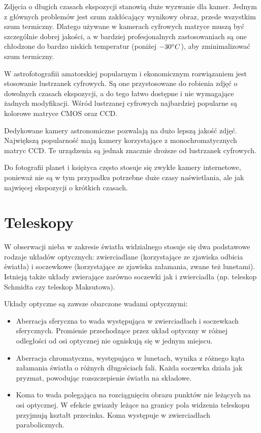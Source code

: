 Zdjęcia o długich czasach ekspozycji stanowią duże wyzwanie dla kamer. Jednym
z głównych problemów jest szum zakłócający wynikowy obraz, przede wszystkim szum
termiczny. Dlatego używane w kamerach cyfrowych matryce muszą być szczególnie
dobrej jakości, a w bardziej profesjonalnych zastosowaniach są one chłodzone do
bardzo niskich temperatur (poniżej $-30\degree C$), aby zminimalizować szum
termiczny.

W astrofotografiii amatorskiej popularnym i ekonomicznym rozwiązaniem jest
stosowanie lustrzanek cyfrowych. Są one przystosowane do robienia zdjęć
o dowolnych czasach ekspozycji, a do tego łatwo dostępne i nie wymagające
żadnych modyfikacji. Wśród lustrzanej cyfrowych najbardziej popularne są
kolorowe matryce CMOS oraz CCD.

Dedykowane kamery astronomiczne pozwalają na dużo lepszą jakość zdjęć.
Największą popularność mają kamery korzystające z monochromatycznych matryc CCD.
Te urządzenia są jednak znacznie droższe od lustrzanek cyfrowych.

Do fotografii planet i księżyca często stosuje się zwykłe kamery internetowe,
ponieważ nie są w tym przypadku potrzebne duże czasy naświetlania, ale jak
najwięcej ekspozycji o krótkich czasach.

\section{Teleskopy}

W obserwacji nieba w zakresie światła widzialnego stosuje się dwa podstawowe
rodzaje układów optycznych: zwierciadlane (korzystające ze zjawiska odbicia
światła) i soczewkowe (korzystające ze zjawiska załamania, zwane też lunetami).
Istnieją także układy zwierające zarówno soczewki jak i zwierciadła (np.
teleskop Schmidta czy teleskop Maksutowa). 

Układy optyczne są zawsze obarczone wadami optycznymi:

\begin{itemize}

	\item Aberracja sferyczna to wada występująca w zwierciadłach
		i soczewkach sferycznych. Promienie przechodzące przez układ
		optyczny w różnej odległości od osi optycznej nie ogniskują się
		w jednym miejscu.
	
	\item Aberracja chromatyczna, występująca w lunetach, wynika z różnego
		kąta załamania światła o różnych długościach fali. Każda
		soczewka działa jak pryzmat, powodując rozszczepienie światła na
		składowe.

	\item Koma to wada polegająca na rozciągnięciu obrazu punktów nie
		leżących na osi optycznej. W efekcie gwiazdy leżące na granicy
		pola widzenia teleskopu przyjmują kształt przecinka. Koma
		występuje w zwierciadłach parabolicznych.

\end{itemize}

